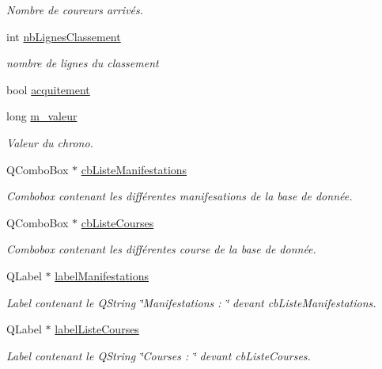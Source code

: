 \begin{DoxyCompactItemize}
\begin{DoxyCompactList}\small\item\em Nombre de coureurs arrivés. \end{DoxyCompactList}\item 
int \hyperlink{class_i_h_m_chrono_cross_a86ed3469ca99988211bcf0970527c119}{nb\+Lignes\+Classement}
\begin{DoxyCompactList}\small\item\em nombre de lignes du classement \end{DoxyCompactList}\item 
bool \hyperlink{class_i_h_m_chrono_cross_a3ad2d6f9520ae7ed917fba070ed55d4c}{acquitement}
\item 
long \hyperlink{class_i_h_m_chrono_cross_a4bb2449f0b2cc9891c09fa3e32f56229}{m\+\_\+valeur}
\begin{DoxyCompactList}\small\item\em Valeur du chrono. \end{DoxyCompactList}\item 
Q\+Combo\+Box $\ast$ \hyperlink{class_i_h_m_chrono_cross_a4b7a6af527d8d2d28d8ea6ea7cbfac75}{cb\+Liste\+Manifestations}
\begin{DoxyCompactList}\small\item\em Combobox contenant les différentes manifesations de la base de donnée. \end{DoxyCompactList}\item 
Q\+Combo\+Box $\ast$ \hyperlink{class_i_h_m_chrono_cross_af47891e3e9f2bb2c955be8c128e830b5}{cb\+Liste\+Courses}
\begin{DoxyCompactList}\small\item\em Combobox contenant les différentes course de la base de donnée. \end{DoxyCompactList}\item 
Q\+Label $\ast$ \hyperlink{class_i_h_m_chrono_cross_a7430cf36cc48d17297ddc03fe69e9b72}{label\+Manifestations}
\begin{DoxyCompactList}\small\item\em Label contenant le Q\+String \char`\"{}\+Manifestations \+: \char`\"{} devant cb\+Liste\+Manifestations. \end{DoxyCompactList}\item 
Q\+Label $\ast$ \hyperlink{class_i_h_m_chrono_cross_a2b563f2574ad86acaecc01f0357f85be}{label\+Liste\+Courses}
\begin{DoxyCompactList}\small\item\em Label contenant le Q\+String \char`\"{}\+Courses \+: \char`\"{} devant cb\+Liste\+Courses. \end{DoxyCompactList}\item 

\end{DoxyCompactItemize}
